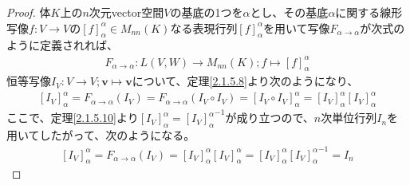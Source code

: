 \documentclass[dvipdfmx]{jsarticle}
\begin{document}
\begin{proof}
体$K$上の$n$次元vector空間$V$の基底の1つを$\alpha$とし、その基底$\alpha$に関する線形写像$f:V \rightarrow V$の$[ f]_{\alpha}^{\alpha} \in M_{nn}(K)$なる表現行列$[ f]_{\alpha}^{\alpha}$を用いて写像$F_{\alpha \rightarrow \alpha}$が次式のように定義されれば、
\begin{align*}
F_{\alpha \rightarrow \alpha}:L(V,W) \rightarrow M_{nn}(K);f \mapsto [ f]_{\alpha}^{\alpha}
\end{align*}
恒等写像$I_{V}:V \rightarrow V;\mathbf{v} \mapsto \mathbf{v}$について、定理\ref{2.1.5.8}より次のようになり、
\begin{align*}
\left[ I_{V} \right]_{\alpha}^{\alpha} = F_{\alpha \rightarrow \alpha}\left( I_{V} \right) = F_{\alpha \rightarrow \alpha}\left( I_{V} \circ I_{V} \right) = \left[ I_{V} \circ I_{V} \right]_{\alpha}^{\alpha} = \left[ I_{V} \right]_{\alpha}^{\alpha}\left[ I_{V} \right]_{\alpha}^{\alpha}
\end{align*}
ここで、定理\ref{2.1.5.10}より$\left[ I_{V} \right]_{\alpha}^{\alpha} = {\left[ I_{V} \right]_{\alpha}^{\alpha}}^{- 1}$が成り立つので、$n$次単位行列$I_{n}$を用いてしたがって、次のようになる。
\begin{align*}
\left[ I_{V} \right]_{\alpha}^{\alpha} = F_{\alpha \rightarrow \alpha}\left( I_{V} \right) = \left[ I_{V} \right]_{\alpha}^{\alpha}\left[ I_{V} \right]_{\alpha}^{\alpha} = \left[ I_{V} \right]_{\alpha}^{\alpha}{\left[ I_{V} \right]_{\alpha}^{\alpha}}^{- 1} = I_{n}
\end{align*}
\end{proof}
\end{document}
